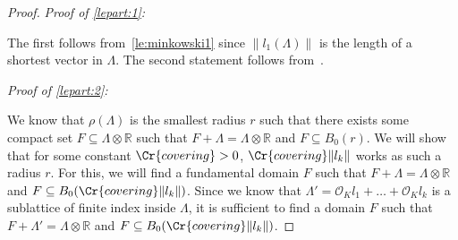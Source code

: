 \documentclass{amsart}
\theoremstyle{definition}
\theoremstyle{remark}
\newcommand{\OK}{\mathcal{O}_K}
\begin{document}
\begin{proof}

    { \em Proof of \ref{lepart:1}: }

    The first follows from~\cref{le:minkowski1} since $\|l_{1}(\Lambda)\|$ is the length of a shortest vector in $\Lambda$.
    The second statement follows from~\cite[Theorem 2]{FD10}.

    { \em Proof of \ref{lepart:2}: }

    We know that $\rho(\Lambda)$ is the smallest radius $r$ such that there exists some compact set $F \subseteq \Lambda \otimes \mathbb{R}$ such that 
    $F + \Lambda = \Lambda \otimes \mathbb{R}$ and $F \subseteq B_{0}(r)$. We will show that for some constant $\Cr{covering}>0$,
    $\Cr{covering} \|l_{k}\|$ works as such a radius $r$. For this, we will find a fundamental domain $F$ such that $F + \Lambda = \Lambda \otimes \mathbb{R}$ and $F \subseteq B_{0}(\Cr{covering} \|l_{k}\|)$.
Since we know that $\Lambda' = \OK l_1 + \dots + \OK l_k$ is a sublattice of finite index inside $\Lambda$, it is sufficient to find a domain $F$ such that $F + \Lambda' = \Lambda \otimes \mathbb{R}$ and $F \subseteq B_{0}(\Cr{covering} \|l_{k}\|)$.
    

\end{proof}
\end{document}
